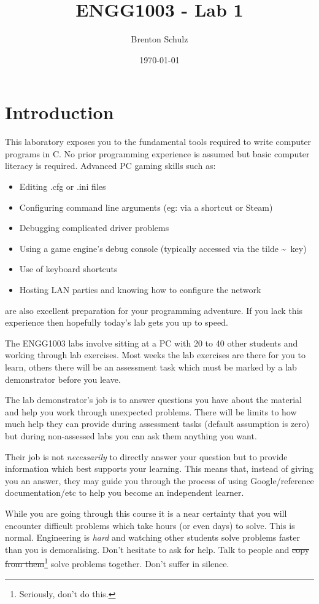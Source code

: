 \documentclass{lab}
\title{ENGG1003 - Lab 1}
\author{Brenton Schulz}
\date{\today}
\begin{document}
\maketitle

\section{Introduction}
This laboratory exposes you to the fundamental tools required to write computer programs in C. No prior programming experience is assumed but basic computer literacy is required. Advanced PC gaming skills such as:

\begin{itemize}
\item Editing .cfg or .ini files
\item Configuring command line arguments (eg: via a shortcut or Steam)
\item Debugging complicated driver problems
\item Using a game engine's debug console (typically accessed via the tilde \textasciitilde\ key)
\item Use of keyboard shortcuts
\item Hosting LAN parties and knowing how to configure the network
\end{itemize}

are also excellent preparation for your programming adventure. If you lack this experience then hopefully today's lab gets you up to speed.

The ENGG1003 labs involve sitting at a PC with 20 to 40 other students and working through lab exercises. Most weeks the lab exercises are there for you to learn, others there will be an assessment task which must be marked by a lab demonstrator before you leave.

The lab demonstrator's job is to answer questions you have about the material and help you work through unexpected problems. There will be limits to how much help they can provide during assessment tasks (default assumption is zero) but during non-assessed labs you can ask them anything you want.

Their job is not \textit{necessarily} to directly answer your question but to provide information which best supports your learning. This means that, instead of giving you an answer, they may guide you through the process of using Google/reference documentation/etc to help you become an independent learner.

While you are going through this course it is a near certainty that you will encounter difficult problems which take hours (or even days) to solve. This is normal. Engineering is \textit{hard} and watching other students solve problems faster than you is demoralising. Don't hesitate to ask for help. Talk to people and \st{copy from them}\footnote{Seriously, don't do this.} solve problems together. Don't suffer in silence.
\end{document}
